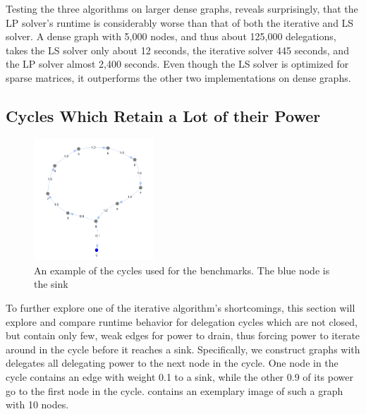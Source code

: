 Testing the three algorithms on larger dense graphs, reveals surprisingly, that the LP solver's runtime is considerably worse than that of both the iterative and LS solver. A dense graph with 5,000 nodes, and thus about 125,000 delegations, takes the LS solver only about 12 seconds, the iterative solver 445 seconds, and the LP solver almost 2,400 seconds. Even though the LS solver is optimized for sparse matrices, it outperforms the other two implementations on dense graphs.

\subsection{Cycles Which Retain a Lot of their Power}

\label{subsec:cycles_draining}

\begin{figure}[h]
	\centering
	\includegraphics[width=0.4\textwidth]{big_cycle_example}
	\caption{An example of the cycles used for the benchmarks. The blue node is the sink}
	\label{fig:big_cycle_example}
\end{figure}

To further explore one of the iterative algorithm's shortcomings, this section will explore and compare runtime behavior for delegation cycles which are not closed, but contain only few, weak edges for power to drain, thus forcing power to iterate around in the cycle before it reaches a sink. Specifically, we construct graphs with delegates all delegating power to the next node in the cycle. One node in the cycle contains an edge with weight 0.1 to a sink, while the other 0.9 of its power go to the first node in the cycle.  contains an exemplary image of such a graph with 10 nodes. 

